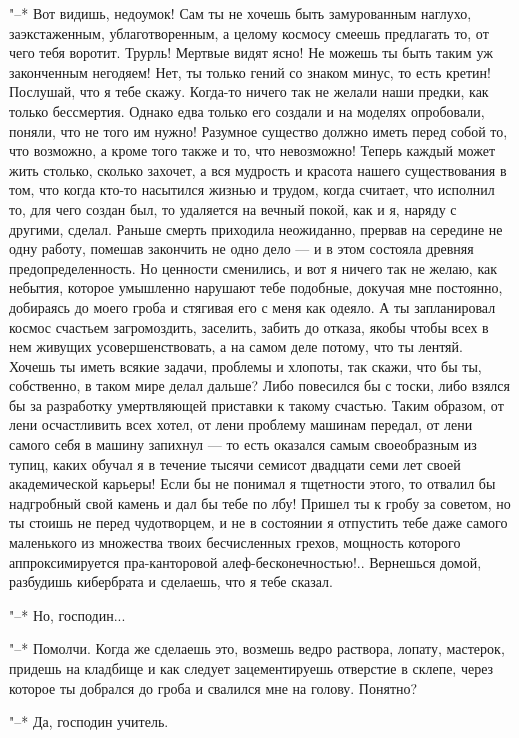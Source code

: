 "--* Вот видишь, недоумок! Сам ты не хочешь быть
замурованным наглухо, заэкстаженным, ублаготворенным, а
целому космосу смеешь предлагать то, от чего тебя воротит.
Трурль! Мертвые видят ясно! Не можешь ты быть таким уж
законченным негодяем! Нет, ты только гений со знаком минус,
то есть кретин! Послушай, что я тебе скажу. Когда-то ничего
так не желали наши предки, как только бессмертия. Однако
едва только его создали и на моделях опробовали, поняли, что
не того им нужно! Разумное существо должно иметь перед собой
то, что возможно, а кроме того также и то, что невозможно!
Теперь каждый может жить столько, сколько захочет, а вся
мудрость и красота нашего существования в том, что когда
кто-то насытился жизнью и трудом, когда считает, что
исполнил то, для чего создан был, то удаляется на вечный
покой, как и я, наряду с другими, сделал. Раньше смерть
приходила неожиданно, прервав на середине не одну работу,
помешав закончить не одно дело --- и в этом состояла древняя
предопределенность. Но ценности сменились, и вот я ничего
так не желаю, как небытия, которое умышленно нарушают тебе
подобные, докучая мне постоянно, добираясь до моего гроба и
стягивая его с меня как одеяло. А ты запланировал космос
счастьем загромоздить, заселить, забить до отказа, якобы
чтобы всех в нем живущих усовершенствовать, а на самом деле
потому, что ты лентяй. Хочешь ты иметь всякие задачи,
проблемы и хлопоты, так скажи, что бы ты, собственно, в
таком мире делал дальше? Либо повесился бы с тоски, либо
взялся бы за разработку умертвляющей приставки к такому
счастью. Таким образом, от лени осчастливить всех хотел, от
лени проблему машинам передал, от лени самого себя в машину
запихнул --- то есть оказался самым своеобразным из тупиц,
каких обучал я в течение тысячи семисот двадцати семи лет
своей академической карьеры! Если бы не понимал я тщетности
этого, то отвалил бы надгробный свой камень и дал бы тебе по
лбу! Пришел ты к гробу за советом, но ты стоишь не перед
чудотворцем, и не в состоянии я отпустить тебе даже самого
маленького из множества твоих бесчисленных грехов, мощность
которого аппроксимируется пра-канторовой
алеф-бесконечностью!.. Вернешься домой, разбудишь кибербрата
и сделаешь, что я тебе сказал.

"--* Но, господин...

"--* Помолчи. Когда же сделаешь это, возмешь ведро
раствора, лопату, мастерок, придешь на кладбище и как
следует зацементируешь отверстие в склепе, через которое ты
добрался до гроба и свалился мне на голову. Понятно?

"--* Да, господин учитель.

